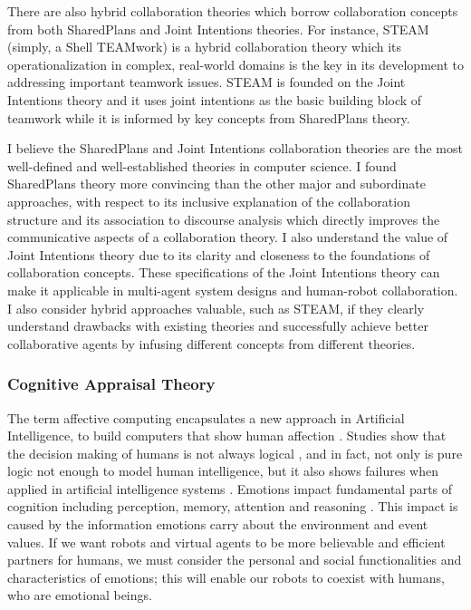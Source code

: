 \documentclass[a4paper, 11pt]{article}
\begin{document}
\begin{small}
There are also hybrid collaboration theories which borrow collaboration
concepts from both SharedPlans and Joint Intentions theories. For instance,
STEAM \cite{tambe:flexible-teamwork} (simply, a Shell TEAMwork) is a hybrid
collaboration theory which its operationalization in complex, real-world domains
is the key in its development to addressing important teamwork issues. STEAM is
founded on the Joint Intentions theory and it uses joint intentions as the basic
building block of teamwork while it is informed by key concepts from SharedPlans
theory.


I believe the SharedPlans and Joint Intentions collaboration theories are the
most well-defined and well-established theories in computer science. I found
SharedPlans theory more convincing than the other major and subordinate
approaches, with respect to its inclusive explanation of the collaboration
structure and its association to discourse analysis which directly improves the
communicative aspects of a collaboration theory. I also understand the value of
Joint Intentions theory due to its clarity and closeness to the foundations of
collaboration concepts. These specifications of the Joint Intentions theory can
make it applicable in multi-agent system designs and human-robot collaboration.
I also consider hybrid approaches valuable, such as STEAM, if they clearly
understand drawbacks with existing theories and successfully achieve better
collaborative agents by infusing different concepts from different theories.
\vspace*{-8mm}
\subsubsection*{Cognitive Appraisal Theory}

The term affective computing encapsulates a new approach in Artificial
Intelligence, to build computers that show human affection
\cite{picard:affective-computing}. Studies show that the decision making of
humans is not always logical \cite{GrossbergGutowski:affect-cognition}, and in
fact, not only is pure logic not enough to model human intelligence, but it also
shows failures when applied in artificial intelligence systems
\cite{dreyfus:artificial-critique}. Emotions impact fundamental parts of
cognition including perception, memory, attention and reasoning
\cite{clore:judgement-regulation}. This impact is caused by the information
emotions carry about the environment and event values. If we want robots and
virtual agents to be more believable and efficient partners for humans, we must
consider the personal and social functionalities and characteristics of
emotions; this will enable our robots to coexist with humans, who are emotional
beings.


\end{small}
\end{document}

